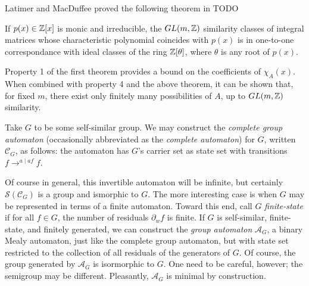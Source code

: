 \documentclass[11pt]{article}
\begin{document}
Latimer and MacDuffee proved the following theorem in TODO

\begin{theorem}
  If $p(x) \in \mathbb{Z}[x]$ is monic and irreducible, the $GL(m, \mathbb{Z})$
  similarity classes of integral matrices whose characteristic
  polynomial coincides with $p(x)$ is in one-to-one correspondance
  with ideal classes of the ring $\mathbb{Z}[\theta]$, where $\theta$ is any
  root of $p(x)$.
\end{theorem}

Property 1 of the first theorem provides a bound on the coefficients
of $\chi_A(x)$. When combined with property 4 and the above theorem,
it can be shown that, for fixed $m$, there exist only finitely many
possibilities of $A$, up to $GL(m, \mathbb{Z})$ similarity.

\begin{definition}
  Take $G$ to be some self-similar group. We may construct the
  \emph{complete group automaton} (occasionally abbreviated as the
  \emph{complete automaton}) for $G$, written $\mathcal{C}_G$, as
  follows: the automaton has $G$'s carrier set as state set with
  transitions $f \longrightarrow^{a\mid af} f$.
\end{definition}

Of course in general,
this invertible automaton will be infinite, but certainly
$\mathcal{S}(\mathcal{C}_G)$ is a group and ismorphic to $G$. The more
interesting case is when $G$ may be represented in terms of a finite
automaton. Toward this end, call $G$ \emph{finite-state} if for all
$f \in G$, the number of residuals $\partial_w f$ is finite. If $G$ is
self-similar, finite-state, and finitely generated, we can construct
the \emph{group automaton} $\mathcal{A}_G$, a binary Mealy automaton,
just like the complete group automaton, but with state set restricted
to the collection of all residuals of the generators of $G$. Of
course, the group generated by $\mathcal{A}_G$ is isormorphic to
$G$. One need to be careful, however; the semigroup may be
different. Pleasantly, $\mathcal{A}_G$ is minimal by construction.
\end{document}
